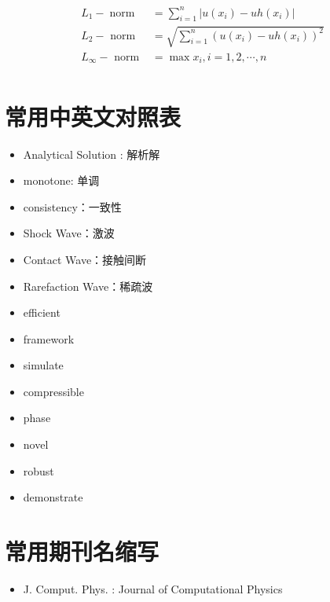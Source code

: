 \documentclass{book}
\begin{document}
\begin{example}
\begin{example}{}{}
\begin{example}
\begin{example}
\begin{example}
\begin{example}
\begin{example}{}{}
\begin{example}
\begin{equation}
    \begin{aligned}
        L_{1}-\operatorname{norm} & =\sum_{i=1}^{n}\left|u\left(x_{i}\right)-u h\left(x_{i}\right)\right|            \\
        L_{2}-\text { norm }      & =\sqrt{\sum_{i=1}^{n}\left(u\left(x_{i}\right)-u h\left(x_{i}\right)\right)^{2}} \\
        L_{\infty}-\text { norm } & =\max x_i,i=1,2,\cdots,n                                                         \\
    \end{aligned}
\end{equation}
\section{常用中英文对照表}
\begin{itemize}
    \item Analytical Solution : 解析解
    \item monotone: 单调
    \item consistency：一致性
    \item Shock Wave：激波
    \item Contact Wave：接触间断
    \item Rarefaction Wave：稀疏波
    \item efficient
    \item framework
    \item simulate
    \item compressible
    \item phase
    \item novel
    \item robust
    \item demonstrate
\end{itemize}
\section{常用期刊名缩写}
\begin{itemize}
    \item J. Comput. Phys. : Journal of Computational Physics
\end{itemize}

\end{example}
\end{example}
\end{example}
\end{example}
\end{example}
\end{example}
\end{example}
\end{example}
\end{document}
